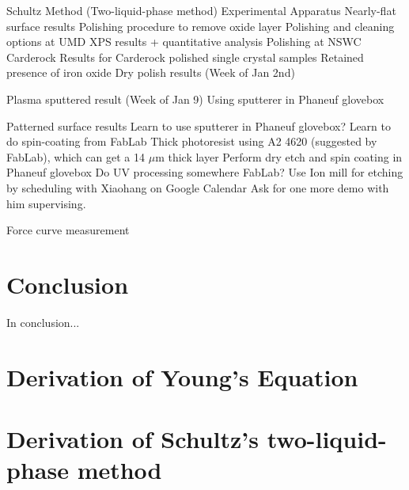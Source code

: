 \documentclass[12pt,letterpaper]{report}
\begin{document}
\begin{outline}[enumerate]
\1 Schultz Method (Two-liquid-phase method)
	\2 Experimental Apparatus
\1 Nearly-flat surface results
	\2 Polishing procedure to remove oxide layer
		\3 Polishing and cleaning options at UMD
			\4 XPS results + quantitative analysis
		\3 Polishing at NSWC Carderock
	\2 Results for Carderock polished single crystal samples
		\3 Retained presence of iron oxide
	\2 Dry polish results (Week of Jan 2nd)
	
	\2 Plasma sputtered result (Week of Jan 9)
		\3 Using sputterer in Phaneuf glovebox
		
\1 Patterned surface results
	\2 Learn to use sputterer in Phaneuf glovebox?
	\2 Learn to do spin-coating from FabLab
		\3 Thick photoresist using A2 4620 (suggested by FabLab), which can get a 14 $\mu$m thick layer
	\2 Perform dry etch and spin coating in Phaneuf glovebox
	\2 Do UV processing somewhere
		\3 FabLab?
	\2 Use Ion mill for etching by scheduling with Xiaohang on Google Calendar
		\3 Ask for one more demo with him supervising. 
	
\1 Force curve measurement
	
	
	
\end{outline}




\chapter{Conclusion}
In conclusion...

\newpage
\appendix
\chapter{Derivation of Young's Equation}\label{appendixA}


\chapter{Derivation of Schultz's two-liquid-phase method}\label{appendixB}


\newpage


\end{document}
